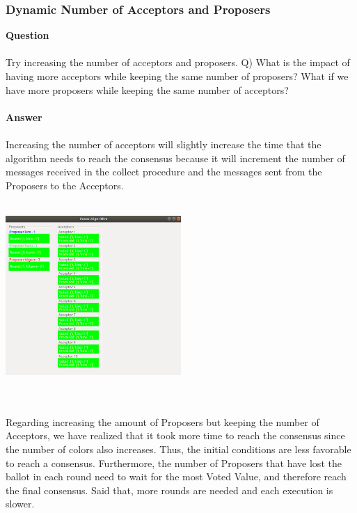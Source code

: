 \documentclass[a4paper, 10pt]{article}
\begin{document}
\subsubsection{Dynamic Number of Acceptors and Proposers}
\textbf{\large{Question}}\\\\
Try increasing the number of acceptors and proposers. Q) What is the impact of having more acceptors while keeping the same number of proposers? What if we have more proposers while keeping the same number of acceptors?
\\\\
\textbf{\large{Answer}}\\\\
Increasing the number of acceptors will slightly increase the time that the algorithm
needs to reach the consensus because it will increment the number of messages received in the collect procedure and the messages sent from the Proposers to the Acceptors.
\\\\
\begin{minipage}[t]{\linewidth}
    \centering
    \includegraphics[width=0.5\textwidth]{10Acceptors}
\end{minipage}\\\\
Regarding increasing the amount of Proposers but keeping the number of
Acceptors, we have realized that it took more time to reach the consensus since the number of colors also increases. Thus, the initial conditions are less favorable to reach a consensus. Furthermore, the number of Proposers that have lost the ballot in each round need to wait for the most Voted Value, and therefore reach the final consensus. Said that, more rounds are needed and each execution is slower.\\\\
\end{document}
